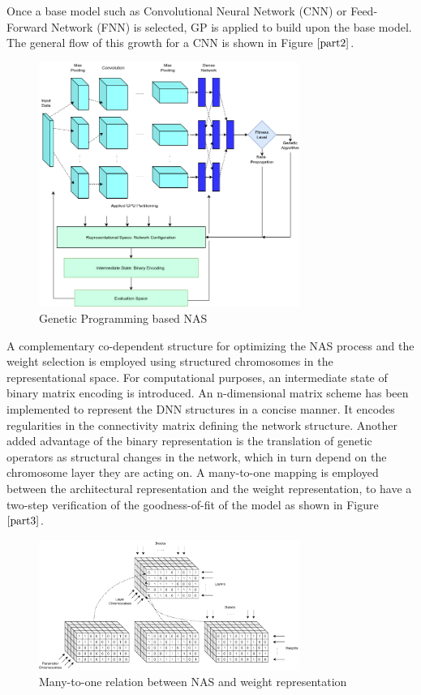 \documentclass[conference]{IEEEtran}
\begin{document}
Once a base model such as Convolutional Neural Network (CNN) or Feed-Forward Network (FNN) is selected, GP is applied to build upon the base model. The general flow of this growth for a CNN is shown in Figure $\ref{part2}$. 

\begin{figure}[!b]
\centerline{\includegraphics[width=85mm]{part2.png}}
\caption{Genetic Programming based NAS}
\label{part2}
\end{figure}

A complementary co-dependent structure for optimizing the NAS process and the weight selection is employed using structured chromosomes in the representational space. For computational purposes, an intermediate state of binary matrix encoding is introduced. An n-dimensional matrix scheme has been implemented to represent the DNN structures in a concise manner. It encodes regularities in the connectivity matrix defining the network structure. Another added advantage of the binary representation is the translation of genetic operators as structural changes in the network, which in turn depend on the chromosome layer they are acting on. A many-to-one mapping is employed between the architectural representation and the weight representation, to have a two-step verification of the goodness-of-fit of the model as shown in Figure $\ref{part3}$.

\begin{figure}[!b]
\centerline{\includegraphics[width=85mm]{part3.png}}
\caption{Many-to-one relation between NAS and weight representation}
\label{part3}
\end{figure}
\end{document}
